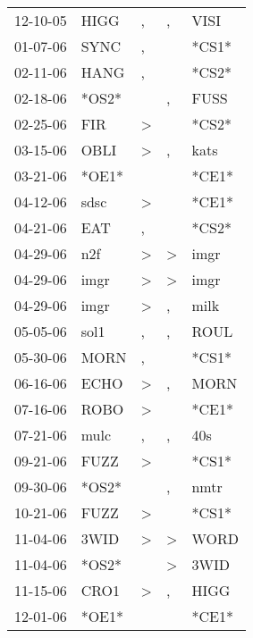 \begin{supertabular}{lllll}
 12-10-05 &   HIGG &                , &                , &   VISI \\
 01-07-06 &   SYNC &                , &                  &  *CS1* \\
 02-11-06 &   HANG &                , &                  &  *CS2* \\
 02-18-06 &  *OS2* &                  &                , &   FUSS \\
 02-25-06 &    FIR &     \textgreater &                  &  *CS2* \\
 03-15-06 &   OBLI &     \textgreater &                , &   kats \\
 03-21-06 &  *OE1* &                  &                  &  *CE1* \\
 04-12-06 &   sdsc &     \textgreater &                  &  *CE1* \\
 04-21-06 &    EAT &                , &                  &  *CS2* \\
 04-29-06 &    n2f &     \textgreater &     \textgreater &   imgr \\
 04-29-06 &   imgr &     \textgreater &     \textgreater &   imgr \\
 04-29-06 &   imgr &     \textgreater &                , &   milk \\
 05-05-06 &   sol1 &                , &                , &   ROUL \\
 05-30-06 &   MORN &                , &                  &  *CS1* \\
 06-16-06 &   ECHO &     \textgreater &                , &   MORN \\
 07-16-06 &   ROBO &     \textgreater &                  &  *CE1* \\
 07-21-06 &   mulc &                , &                , &    40s \\
 09-21-06 &   FUZZ &     \textgreater &                  &  *CS1* \\
 09-30-06 &  *OS2* &                  &                , &   nmtr \\
 10-21-06 &   FUZZ &     \textgreater &                  &  *CS1* \\
 11-04-06 &   3WID &     \textgreater &     \textgreater &   WORD \\
 11-04-06 &  *OS2* &                  &     \textgreater &   3WID \\
 11-15-06 &   CRO1 &     \textgreater &                , &   HIGG \\
 12-01-06 &  *OE1* &                  &                  &  *CE1* \\

\end{supertabular}

